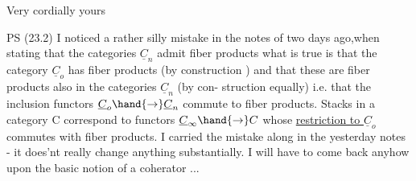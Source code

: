 Very cordially yours 

PS  (23.2)  I noticed a rather silly mistake in the notes of two days
ago,when stating that the categories $\underline{C}_n$ admit fiber products \unsure{\over{-}{:}} what is
true is that the category $\underline{C}_o$ has fiber products (by construction ) 
and that these are fiber products also in the categories $\underline{C}_n$ (by con-%
struction equally) i.e. that the inclusion functors $\underline{C}_o \hand{\to} \underline{C}_n$ commute to
fiber products.  Stacks in a category C correspond to functors
$\underline{C}_\infty \hand{\to} C$  whose \uline{restriction to $\underline{C}_o$} commutes with fiber products. I carried
the mistake along in the  yesterday notes  -  it does'nt really
change anything substantially.  I will have to come back anyhow upon the
basic notion of a coherator ...


